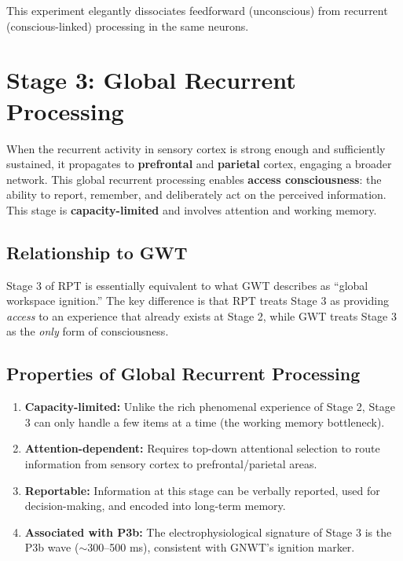 \documentclass[11pt,a4paper]{report}
\begin{document}
This experiment elegantly dissociates feedforward (unconscious) from recurrent (conscious-linked) processing in the same neurons.

\section{Stage 3: Global Recurrent Processing}

\begin{stagebox}
When the recurrent activity in sensory cortex is strong enough and sufficiently sustained, it propagates to \textbf{prefrontal} and \textbf{parietal} cortex, engaging a broader network. This global recurrent processing enables \textbf{access consciousness}: the ability to report, remember, and deliberately act on the perceived information. This stage is \textbf{capacity-limited} and involves attention and working memory.
\end{stagebox}

\subsection{Relationship to GWT}

Stage 3 of RPT is essentially equivalent to what GWT describes as ``global workspace ignition.'' The key difference is that RPT treats Stage 3 as providing \emph{access} to an experience that already exists at Stage 2, while GWT treats Stage 3 as the \emph{only} form of consciousness.

\subsection{Properties of Global Recurrent Processing}

\begin{enumerate}[leftmargin=2em]
  \item \textbf{Capacity-limited:} Unlike the rich phenomenal experience of Stage 2, Stage 3 can only handle a few items at a time (the working memory bottleneck).
  \item \textbf{Attention-dependent:} Requires top-down attentional selection to route information from sensory cortex to prefrontal/parietal areas.
  \item \textbf{Reportable:} Information at this stage can be verbally reported, used for decision-making, and encoded into long-term memory.
  \item \textbf{Associated with P3b:} The electrophysiological signature of Stage 3 is the P3b wave ($\sim$300--500 ms), consistent with GNWT's ignition marker.
\end{enumerate}
\end{document}
